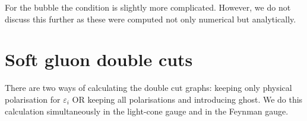 \documentclass[a4paper,11pt]{article}
\numberwithin{equation}{section}
\newcommand{\pola}{\varepsilon}
\begin{document}
For the bubble the condition is slightly more complicated. However, we do not discuss this further as these were computed not only numerical but analytically. 





\newpage

\section{Soft gluon double cuts}

There are two ways of calculating the double cut graphs: keeping only physical polarisation for $\pola_i$ OR keeping all polarisations and introducing ghost. We do this calculation simultaneously in the light-cone gauge and in the Feynman gauge.
\end{document}
